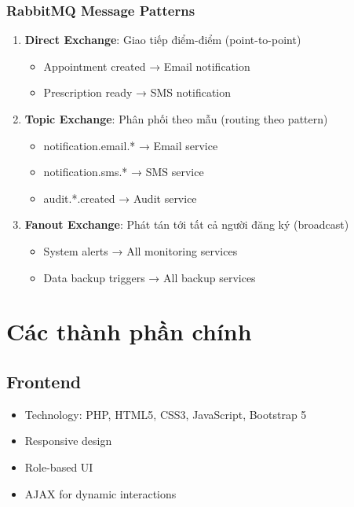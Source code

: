 \documentclass[12pt,a4paper]{report}
\begin{document}
    \subsubsection{RabbitMQ Message Patterns}
    \begin{enumerate}
        \item \textbf{Direct Exchange}: Giao tiếp điểm-điểm (point-to-point)
        \begin{itemize}
            \item Appointment created → Email notification
            \item Prescription ready → SMS notification
        \end{itemize}
        
        \item \textbf{Topic Exchange}: Phân phối theo mẫu (routing theo pattern)
        \begin{itemize}
            \item notification.email.* → Email service
            \item notification.sms.* → SMS service
            \item audit.*.created → Audit service
        \end{itemize}
        
        \item \textbf{Fanout Exchange}: Phát tán tới tất cả người đăng ký (broadcast)
        \begin{itemize}
            \item System alerts → All monitoring services
            \item Data backup triggers → All backup services
        \end{itemize}
    \end{enumerate}

    \section{Các thành phần chính}

    \subsection{Frontend}
    \begin{itemize}
        \item Technology: PHP, HTML5, CSS3, JavaScript, Bootstrap 5
        \item Responsive design
        \item Role-based UI
        \item AJAX for dynamic interactions
    \end{itemize}
\end{document}
